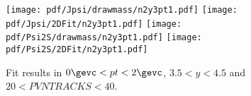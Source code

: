 \begin{figure}[H]
\begin{center}
\texttt{[image: pdf/Jpsi/drawmass/n2y3pt1.pdf]}
\texttt{[image: pdf/Jpsi/2DFit/n2y3pt1.pdf]}
\vspace*{-0.5cm}
\texttt{[image: pdf/Psi2S/drawmass/n2y3pt1.pdf]}
\texttt{[image: pdf/Psi2S/2DFit/n2y3pt1.pdf]}
\vspace*{-0.5cm}
\end{center}
\caption{Fit results in $0\gevc<pt<2\gevc$, $3.5<y<4.5$ and $20<PVNTRACKS<40$.}
\label{Fitn2y3pt1}
\end{figure}
